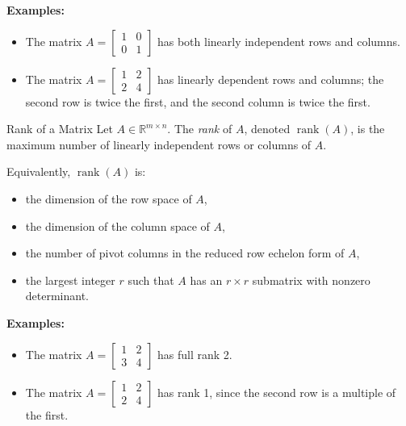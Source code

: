 \textbf{Examples:}
\begin{itemize}
    \item The matrix \( A = \begin{bmatrix}1 & 0 \\ 0 & 1\end{bmatrix} \) has both linearly independent rows and columns.
    \item The matrix \( A = \begin{bmatrix}1 & 2 \\ 2 & 4\end{bmatrix} \) has linearly dependent rows and columns; the second row is twice the first, and the second column is twice the first.
\end{itemize}

\vspace{1em}

\begin{definition}{Rank of a Matrix}{}
Let \( A \in \mathbb{R}^{m \times n} \). The \emph{rank} of \( A \), denoted \( \operatorname{rank}(A) \), is the maximum number of linearly independent rows or columns of \( A \).

Equivalently, \( \operatorname{rank}(A) \) is:
\begin{itemize}
  \item the dimension of the row space of \( A \),
  \item the dimension of the column space of \( A \),
  \item the number of pivot columns in the reduced row echelon form of \( A \),
  \item the largest integer \( r \) such that \( A \) has an \( r \times r \) submatrix with nonzero determinant.
\end{itemize}
\end{definition}

\textbf{Examples:}
\begin{itemize}
    \item The matrix \( A = \begin{bmatrix}1 & 2 \\ 3 & 4\end{bmatrix} \) has full rank 2.
    \item The matrix \( A = \begin{bmatrix}1 & 2 \\ 2 & 4\end{bmatrix} \) has rank 1, since the second row is a multiple of the first.
\end{itemize}

